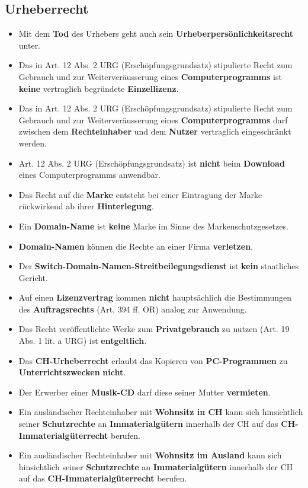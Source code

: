 \subsection{Urheberrecht}
\begin{itemize}
	\item Mit dem \textbf{Tod} des Urhebers geht auch sein \textbf{Urheberpersönlichkeitsrecht} unter.
	\item Das in Art. 12 Abs. 2 URG (Erschöpfungsgrundsatz) stipulierte Recht zum Gebrauch und zur Weiterveräusserung eines \textbf{Computerprogramms} ist \textbf{keine} vertraglich begründete \textbf{Einzellizenz}.
	\item Das in Art. 12 Abs. 2 URG (Erschöpfungsgrundsatz) stipulierte Recht zum Gebrauch und zur Weiterveräusserung eines \textbf{Computerprogramms} darf zwischen dem \textbf{Rechteinhaber} und dem \textbf{Nutzer} vertraglich eingeschränkt werden.
	\item Art. 12 Abs. 2 URG (Erschöpfungsgrundsatz) ist \textbf{nicht} beim \textbf{Download} eines Computerprogramms anwendbar.
	\item Das Recht auf die \textbf{Marke} entsteht bei einer Eintragung der Marke rückwirkend ab ihrer \textbf{Hinterlegung}.
	\item Ein \textbf{Domain-Name} ist \textbf{keine} Marke im Sinne des Markenschutzgesetzes.
	\item \textbf{Domain-Namen} können die Rechte an einer Firma \textbf{verletzen}.
	\item Der \textbf{Switch-Domain-Namen-Streitbeilegungsdienst} ist \textbf{kein} staatliches Gericht.
	\item Auf einen \textbf{Lizenzvertrag} kommen \textbf{nicht} hauptsächlich die Bestimmungen des \textbf{Auftragsrechts} (Art. 394 ff. OR) analog zur Anwendung.
	\item Das Recht veröffentlichte Werke zum \textbf{Privatgebrauch} zu nutzen (Art. 19 Abs. 1 lit. a URG) ist \textbf{entgeltlich}.
	\item Das \textbf{CH-Urheberrecht} erlaubt das Kopieren von \textbf{PC-Programmen} zu \textbf{Unterrichtszwecken} \textbf{nicht}.
	\item Der Erwerber einer \textbf{Musik-CD} darf diese seiner Mutter \textbf{vermieten}.
	\item Ein ausländischer Rechteinhaber mit \textbf{Wohnsitz in CH} kann sich hinsichtlich seiner \textbf{Schutzrechte} an \textbf{Immaterialgütern} innerhalb der CH auf das \textbf{CH-Immaterialgüterrecht} berufen.
	\item Ein ausländischer Rechteinhaber mit \textbf{Wohnsitz im Ausland} kann sich hinsichtlich seiner \textbf{Schutzrechte} an \textbf{Immaterialgütern} innerhalb der CH auf das \textbf{CH-Immaterialgüterrecht} berufen.

\end{itemize}

